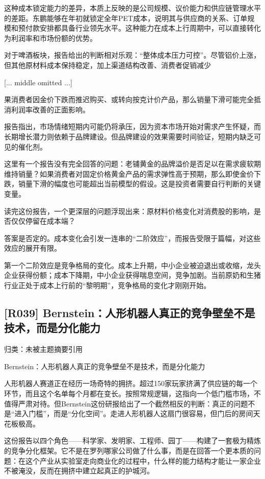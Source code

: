 \documentclass[11pt]{ctexart}
\begin{document}
这种成本锁定能力的差异，本质上反映的是公司规模、议价能力和供应链管理水平的差距。东鹏能够在年初就锁定全年PET成本，说明其与供应商的关系、订单规模和预付款安排都具备行业领先水平。这种能力在成本上行周期中，可以直接转化为利润率和市场份额的优势。

对于啤酒板块，报告给出的判断相对乐观：“整体成本压力可控”。尽管铝价上涨，但其他原材料成本保持稳定，加上渠道结构改善、消费者促销减少

[... middle omitted ...]

果消费者因金价下跌而推迟购买、或转向按克计价产品，那么销量下滑可能完全抵消利润率改善的正面影响。

报告指出，市场情绪短期内可能仍将承压，因为资本市场开始对需求产生怀疑，而长期增长潜力则依赖于品牌建设。但品牌建设的效果需要时间验证，短期内缺乏可见的催化剂。

这里有一个报告没有完全回答的问题：老铺黄金的品牌溢价是否足以在需求疲软期维持销量？如果消费者对固定价格黄金产品的需求弹性高于预期，那么即使金价下跌，销量下滑的幅度也可能超出当前模型的假设。这是投资者需要自行判断的关键变量。

读完这份报告，一个更深层的问题浮现出来：原材料价格变化对消费股的影响，是否仅仅停留在成本端？

答案是否定的。成本变化会引发一连串的“二阶效应”，而报告受限于篇幅，对这些效应的展开有限。

第一个二阶效应是竞争格局的变化。成本上升期，中小企业被迫退出或收缩，龙头企业获得份额；成本下降期，中小企业获得喘息空间，竞争加剧。当前原奶和生猪行业正处于成本上行前的“黎明期”，竞争格局的变化才刚刚开始。

\subsection{[R039] Bernstein：人形机器人真正的竞争壁垒不是技术，而是分化能力}
{\small\color{refgray}归类：未被主题摘要引用}

Bernstein：人形机器人真正的竞争壁垒不是技术，而是分化能力

人形机器人赛道正在经历一场奇特的拥挤。超过150家玩家挤满了供应链的每一个环节，而且这个名单每个月都在变长。按照常规逻辑，这指向一个低门槛市场，不值得严肃对待。但Bernstein这份研报给出了一个截然相反的判断：真正的问题不是“进入门槛”，而是“分化空间”。走进人形机器人这扇门很容易，但门后的房间天花板极高。

这份报告以四个角色——科学家、发明家、工程师、园丁——构建了一套极为精炼的竞争分化框架。它不是在罗列哪家公司做了什么事，而是在回答一个更本质的问题：在这个产业从实验室走向商业化的过程中，什么样的能力结构才能让一家企业不被淹没，反而在拥挤中建立起真正的护城河。
\end{document}
